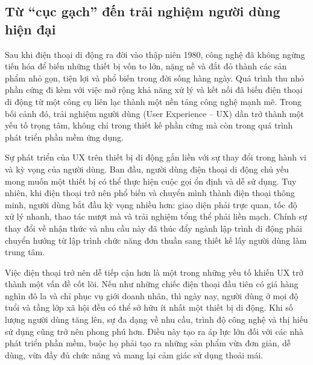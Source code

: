 \subsection{Từ “cục gạch” đến trải nghiệm người dùng hiện đại}
\renewcommand{\labelitemi}{--}    
    \begin{flushleft}
        \hspace*{0.8cm}Sau khi điện thoại di động ra đời vào thập niên 1980, công nghệ đã không ngừng tiến hóa để biến những thiết bị vốn to lớn, nặng nề và đắt đỏ thành các sản phẩm nhỏ gọn, tiện lợi và phổ biến trong đời sống hàng ngày. Quá trình thu nhỏ phần cứng đi kèm với việc mở rộng khả năng xử lý và kết nối đã biến điện thoại di động từ một công cụ liên lạc thành một nền tảng công nghệ mạnh mẽ. Trong bối cảnh đó, trải nghiệm người dùng (User Experience – UX) dần trở thành một yếu tố trọng tâm, không chỉ trong thiết kế phần cứng mà còn trong quá trình phát triển phần mềm ứng dụng.
    \end{flushleft}

    \begin{flushleft}
      \hspace*{0.8cm}Sự phát triển của UX trên thiết bị di động gắn liền với sự thay đổi trong hành vi và kỳ vọng của người dùng. Ban đầu, người dùng điện thoại di động chủ yếu mong muốn một thiết bị có thể thực hiện cuộc gọi ổn định và dễ sử dụng. Tuy nhiên, khi điện thoại trở nên phổ biến và chuyển mình thành điện thoại thông minh, người dùng bắt đầu kỳ vọng nhiều hơn: giao diện phải trực quan, tốc độ xử lý nhanh, thao tác mượt mà và trải nghiệm tổng thể phải liền mạch. Chính sự thay đổi về nhận thức và nhu cầu này đã thúc đẩy ngành lập trình di động phải chuyển hướng từ lập trình chức năng đơn thuần sang thiết kế lấy người dùng làm trung tâm.
    \end{flushleft}

    \begin{flushleft}
      \hspace*{0.8cm}Việc điện thoại trở nên dễ tiếp cận hơn là một trong những yếu tố khiến UX trở thành một vấn đề cốt lõi. Nếu như những chiếc điện thoại đầu tiên có giá hàng nghìn đô la và chỉ phục vụ giới doanh nhân, thì ngày nay, người dùng ở mọi độ tuổi và tầng lớp xã hội đều có thể sở hữu ít nhất một thiết bị di động. Khi số lượng người dùng tăng lên, sự đa dạng về nhu cầu, trình độ công nghệ và thị hiếu sử dụng cũng trở nên phong phú hơn. Điều này tạo ra áp lực lớn đối với các nhà phát triển phần mềm, buộc họ phải tạo ra những sản phẩm vừa đơn giản, dễ dùng, vừa đầy đủ chức năng và mang lại cảm giác sử dụng thoải mái.
  \end{flushleft}

